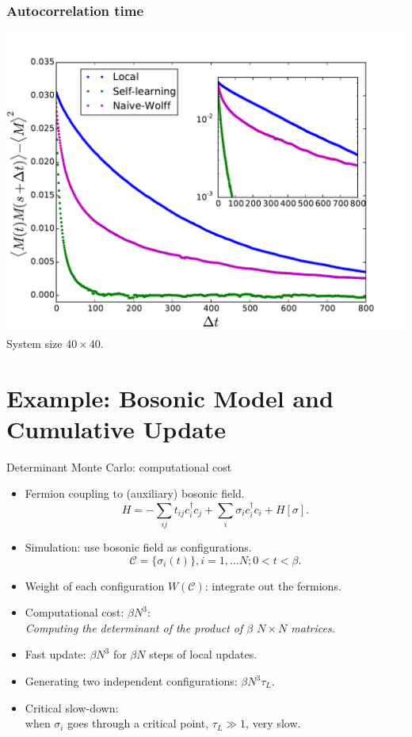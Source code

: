 \documentclass[xcolor=table, 10pt, aspectratio=169]{beamer}
\begin{document}
\begin{frame}
  \frametitle{Autocorrelation time}
  \centering
  \includegraphics[width=.6\textwidth]{auto_decay}\\
  System size $40\times40$.
\end{frame}

\section{Example: Bosonic Model and Cumulative Update}

\begin{frame}{Determinant Monte Carlo: computational cost}
\begin{itemize}
  \item Fermion coupling to (auxiliary) bosonic field.
  \[H=-\sum_{ij}t_{ij}c_i^\dagger c_j
  +\sum_i\sigma_ic_i^\dagger c_i
  +H[\sigma].\]
  \item Simulation: use bosonic field as configurations.
  \[\mathcal C=\{\sigma_i(t)\}, i=1,\ldots N;0<t<\beta.\]
  \item Weight of each configuration $W(\mathcal C)$: integrate out the fermions.
  \item Computational cost: $\beta N^3$:\\
  \emph{\small Computing the determinant of the product of $\beta$ $N\times N$ matrices.}
  \item Fast update: $\beta N^3$ for $\beta N$ steps of local updates.
  \item Generating two independent configurations: $\beta N^3\tau_L$.
  \item Critical slow-down:\\ when $\sigma_i$ goes through a critical point, $\tau_L\gg1$, very slow.
\end{itemize}
\end{frame}
\end{document}
